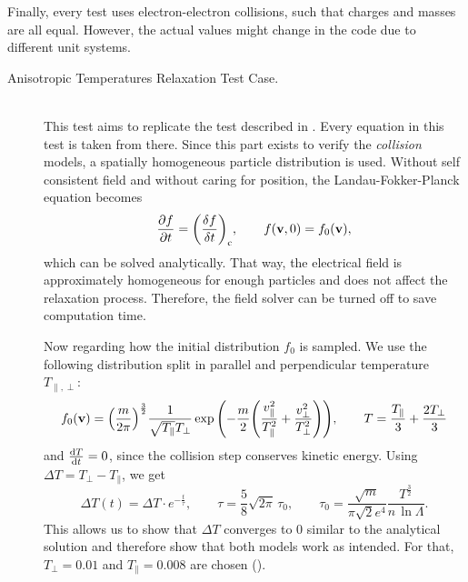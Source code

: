 Finally, every test uses electron-electron collisions, such that charges and masses are all equal. However, the actual values might change in the code due to different unit systems.
\begin{description}
    \item[Anisotropic Temperatures Relaxation Test Case.] \hfill \\
    This test aims to replicate the test described in \cite[4312]{Wang2008}. Every equation in this test is taken from there. Since this part exists to verify the \textit{collision} models, a spatially homogeneous particle distribution is used. Without self consistent field and without caring for position, the Landau-Fokker-Planck equation becomes
    $$
    \pdv{f}{t} = \qty(\fdv{f}{t})_\mathrm{c}, \qquad f(\mathbf{v}, 0) = f_0(\mathbf{v}),
    $$
    which can be solved analytically. That way, the electrical field is approximately homogeneous for enough particles and does not affect the relaxation process. Therefore, the field solver can be turned off to save computation time. 

    Now regarding how the initial distribution $f_0$ is sampled. We use the following distribution split in parallel and perpendicular temperature $T_{\parallel, \perp}$:
    \begin{equation}
        f_0(\mathbf{v}) = \qty(\frac{m}{2\pi})^\frac{3}{2} \frac{1}{\sqrt{T_\parallel }T_\perp} \exp\qty( - \frac{m}{2} \qty( \frac{v_\parallel^2}{T_\parallel^2} + \frac{v_\perp^2}{T_\perp^2}) ) , \qquad T = \frac{T_\parallel}{3} + \frac{2 T_\perp}{3} \label{eq:methodology:initial_distr}
    \end{equation}
    and $\dv{T}{t} = 0$, since the collision step conserves kinetic energy. Using $\Delta T = T_\perp - T_\parallel$, we get
    \begin{equation}
        \Delta T(t) = \Delta T \cdot e^{-\frac{t}{\tau}}, 
        \qquad \tau = \frac{5}{8} \sqrt{2\pi} \,\tau_0,
        \qquad \tau_0 = \frac{\sqrt{m}}{\pi \sqrt{2} e^4} \frac{T^{\frac{3}{2}}}{n\,\ln\Lambda} . \label{eq:methodology:trubnikov_analytical_sol}
    \end{equation}
    This allows us to show that $\Delta T$ converges to $0$ similar to the analytical solution and therefore show that both models work as intended. For that, $T_\perp = 0.01$ and $T_\parallel = 0.008$ are chosen (\cite[4314, 4317]{Wang2008}). 


\end{description}
